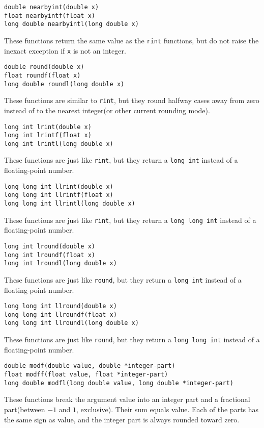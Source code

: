 \documentclass[12pt, titlepage]{article}
\renewcommand{\tt}[1]{\texttt{\small #1}}
\begin{document}
\begin{verbatim}
double nearbyint(double x)
float nearbyintf(float x)
long double nearbyintl(long double x)
\end{verbatim}
These functions return the same value as the \tt{rint} functions, but do not raise the inexact exception if \tt{x} is not an integer.

\begin{verbatim}
double round(double x)
float roundf(float x)
long double roundl(long double x)
\end{verbatim}
These functions are similar to \tt{rint}, but they round halfway cases away from zero instead of to the nearest integer(or other current rounding mode).

\begin{verbatim}
long int lrint(double x)
long int lrintf(float x)
long int lrintl(long double x)
\end{verbatim}
These functions are just like \tt{rint}, but they return a \tt{long int} instead of a floating-point number.

\begin{verbatim}
long long int llrint(double x)
long long int llrintf(float x)
long long int llrintl(long double x)
\end{verbatim}
These functions are just like \tt{rint}, but they return a \tt{long long int} instead of a floating-point number.

\begin{verbatim}
long int lround(double x)
long int lroundf(float x)
long int lroundl(long double x)
\end{verbatim}
These functions are just like \tt{round}, but they return a \tt{long int} instead of a floating-point number.

\begin{verbatim}
long long int llround(double x)
long long int llroundf(float x)
long long int llroundl(long double x)
\end{verbatim}
These functions are just like \tt{round}, but they return a \tt{long long int} instead of a floating-point number.

\begin{verbatim}
double modf(double value, double *integer-part)
float modff(float value, float *integer-part)
long double modfl(long double value, long double *integer-part)
\end{verbatim}
These functions break the argument value into an integer part and a fractional part(between $-1$ and $1$, exclusive). Their sum equals value. Each of the parts has the same sign as value, and the integer part is always rounded toward zero.
\end{document}
